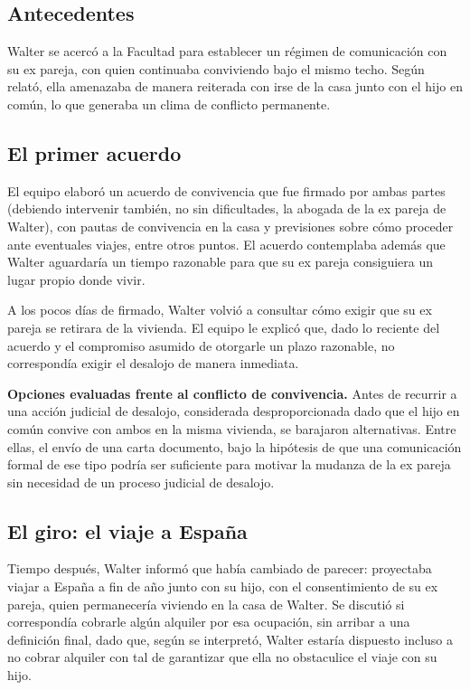 \documentclass[12pt,oneside]{book}
\begin{document}
\subsection{Antecedentes}

Walter se acercó a la Facultad para establecer un régimen de comunicación con su ex pareja, con quien continuaba conviviendo bajo el mismo techo. Según relató, ella amenazaba de manera reiterada con irse de la casa junto con el hijo en común, lo que generaba un clima de conflicto permanente.

\subsection{El primer acuerdo}

El equipo elaboró un acuerdo de convivencia que fue firmado por ambas partes (debiendo intervenir también, no sin dificultades, la abogada de la ex pareja de Walter), con pautas de convivencia en la casa y previsiones sobre cómo proceder ante eventuales viajes, entre otros puntos. El acuerdo contemplaba además que Walter aguardaría un tiempo razonable para que su ex pareja consiguiera un lugar propio donde vivir.

A los pocos días de firmado, Walter volvió a consultar cómo exigir que su ex pareja se retirara de la vivienda. El equipo le explicó que, dado lo reciente del acuerdo y el compromiso asumido de otorgarle un plazo razonable, no correspondía exigir el desalojo de manera inmediata.

\begin{important}
\textbf{Opciones evaluadas frente al conflicto de convivencia.} Antes de recurrir a una acción judicial de desalojo, considerada desproporcionada dado que el hijo en común convive con ambos en la misma vivienda, se barajaron alternativas. Entre ellas, el envío de una carta documento, bajo la hipótesis de que una comunicación formal de ese tipo podría ser suficiente para motivar la mudanza de la ex pareja sin necesidad de un proceso judicial de desalojo.
\end{important}

\subsection{El giro: el viaje a España}

Tiempo después, Walter informó que había cambiado de parecer: proyectaba viajar a España a fin de año junto con su hijo, con el consentimiento de su ex pareja, quien permanecería viviendo en la casa de Walter. Se discutió si correspondía cobrarle algún alquiler por esa ocupación, sin arribar a una definición final, dado que, según se interpretó, Walter estaría dispuesto incluso a no cobrar alquiler con tal de garantizar que ella no obstaculice el viaje con su hijo.
\end{document}
